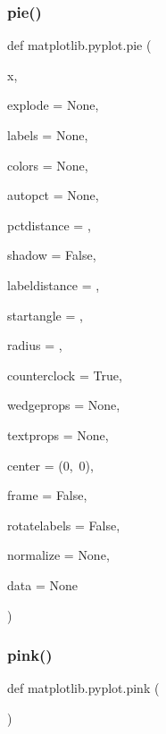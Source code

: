\mbox{\label{namespacematplotlib_1_1pyplot_a6e4f7a9e7985f7fbf9bac51ddd9755d2}} 
\subsubsection{\texorpdfstring{pie()}{pie()}}
{\footnotesize\ttfamily def matplotlib.\+pyplot.\+pie (\begin{DoxyParamCaption}\item[{}]{x,  }\item[{}]{explode = {\ttfamily None},  }\item[{}]{labels = {\ttfamily None},  }\item[{}]{colors = {\ttfamily None},  }\item[{}]{autopct = {\ttfamily None},  }\item[{}]{pctdistance = {},  }\item[{}]{shadow = {\ttfamily False},  }\item[{}]{labeldistance = {},  }\item[{}]{startangle = {},  }\item[{}]{radius = {},  }\item[{}]{counterclock = {\ttfamily True},  }\item[{}]{wedgeprops = {\ttfamily None},  }\item[{}]{textprops = {\ttfamily None},  }\item[{}]{center = {\ttfamily (0,~0)},  }\item[{}]{frame = {\ttfamily False},  }\item[{}]{rotatelabels = {\ttfamily False},  }\item[{}]{normalize = {\ttfamily None},  }\item[{}]{data = {\ttfamily None} }\end{DoxyParamCaption})}

\mbox{\label{namespacematplotlib_1_1pyplot_adc55db53b3bf0c44d2e367156db23dc5}} 
\subsubsection{\texorpdfstring{pink()}{pink()}}
{\footnotesize\ttfamily def matplotlib.\+pyplot.\+pink (\begin{DoxyParamCaption}{ }\end{DoxyParamCaption})}

